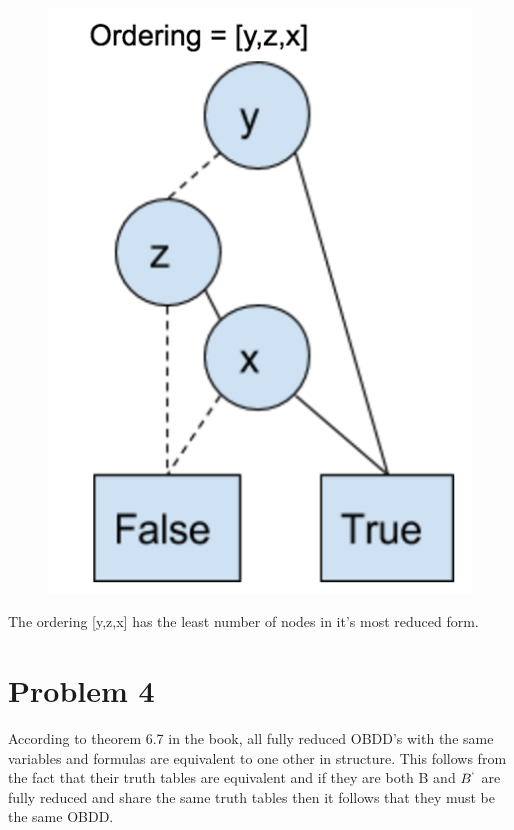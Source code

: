 \documentclass{article}
\begin{document}
\begin{figure}[!htb]
  \includegraphics[width=\linewidth]{3b.png}
\endminipage\hfill
\end{figure}
The ordering [y,z,x] has the least number of nodes in it's most reduced form.
\section{Problem 4}
According to theorem 6.7 in the book, all fully reduced OBDD's with the same variables and formulas are equivalent to one other in structure. This follows from the fact that their truth tables are equivalent and if they are both B and $B^`$ are fully reduced and share the same truth tables then it follows that they must be the same OBDD. 
\end{document}

